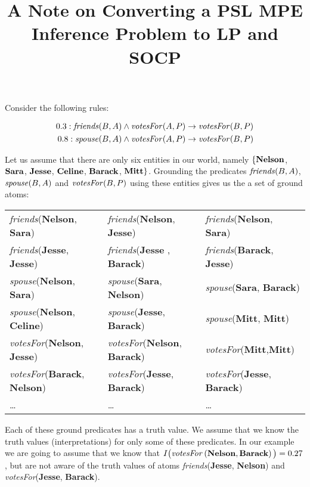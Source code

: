\documentclass[12pt,a4paper]{article}
\title{A Note on Converting a PSL MPE Inference Problem to LP and SOCP \vspace{-2ex} }
\date{}
\begin{document}
\maketitle

Consider the following rules:

\begin{align*}
0.3 : \text{\emph{friends}} (B,A) \land \text{\emph{votesFor}}(A,P) \to \text{\emph{votesFor}}(B,P) \\
0.8 : \text{\emph{spouse}} (B,A) \land \text{\emph{votesFor}}(A,P) \to \text{\emph{votesFor}}(B,P) 
\end{align*}

Let us assume that there are only six entities in our world, namely $\{\text{\textbf{Nelson}}$, $\text{\textbf{Sara}}$, $\text{\textbf{Jesse}}$, $\text{\textbf{Celine}}$, 
$\text{\textbf{Barack}}$, $\text{\textbf{Mitt}}\}$. Grounding the predicates $\text{\emph{friends}}(B,A)$, $\text{\emph{spouse}}(B,A)$ and $\text{\emph{votesFor}}(B,P)$ using these entities gives us the a set of ground atoms:

\begin{center}
\begin{tabular}{|lll|}
\hline
\emph{friends}(\textbf{Nelson}, \textbf{Sara}) & \emph{friends}(\textbf{Nelson}, \textbf{Jesse}) & \emph{friends}(\textbf{Nelson}, \textbf{Sara}) \\
\emph{friends}(\textbf{Jesse}, \textbf{Jesse}) & \emph{friends}(\textbf{Jesse} , \textbf{Barack}) & \emph{friends}(\textbf{Barack}, \textbf{Jesse}) \\
\emph{spouse}(\textbf{Nelson}, \textbf{Sara}) & \emph{spouse}(\textbf{Sara}, \textbf{Nelson}) & \emph{spouse}(\textbf{Sara}, \textbf{Barack}) \\
\emph{spouse}(\textbf{Nelson}, \textbf{Celine}) & \emph{spouse}(\textbf{Jesse}, \textbf{Barack}) & \emph{spouse}(\textbf{Mitt}, \textbf{Mitt})\\
\emph{votesFor}(\textbf{Nelson}, \textbf{Jesse}) & \emph{votesFor}(\textbf{Nelson}, \textbf{Barack}) & \emph{votesFor}(\textbf{Mitt},\textbf{Mitt}) \\
\emph{votesFor}(\textbf{Barack}, \textbf{Nelson}) & \emph{votesFor}(\textbf{Jesse}, \textbf{Barack}) & \emph{votesFor}(\textbf{Jesse}, \textbf{Barack})\\
\ldots & \ldots & \ldots\\
\hline
\end{tabular}
\end{center}

Each of these ground predicates has a truth value. We assume that we know the truth values (interpretations) for only some of these predicates. In our example we are going to assume that we know that $I\big(\text{\emph{votesFor}}\left(\text{\textbf{Nelson}},\text{\textbf{Barack}}\right)\big) = 0.27$, but are not aware of the truth values of atoms \emph{friends}(\textbf{Jesse}, \textbf{Nelson}) and \emph{votesFor}(\textbf{Jesse}, \textbf{Barack}). 
\end{document}
